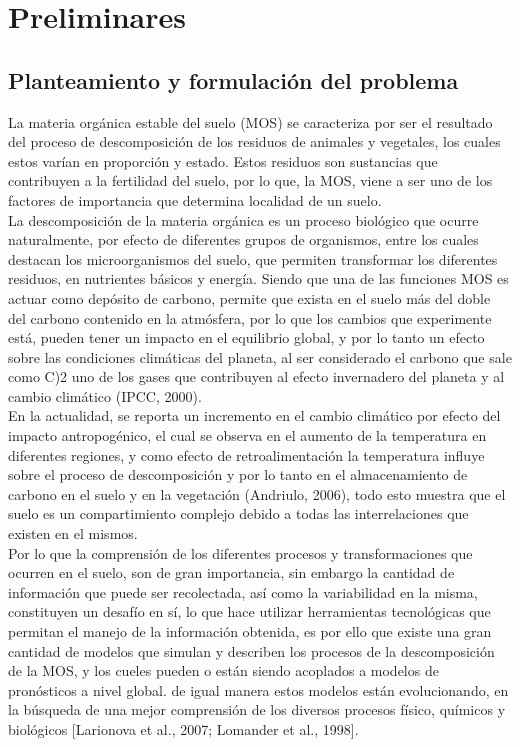 \chapter{Preliminares}

\section{Planteamiento y formulaci\'on del problema}
La materia orgánica estable del suelo (MOS) se caracteriza por ser el resultado del proceso de descomposición de los residuos de animales y vegetales, los cuales estos varían en proporción y estado. Estos residuos son sustancias que contribuyen a la fertilidad del suelo, por lo que, la MOS, viene a ser uno de los factores de importancia que determina localidad de un suelo.\\

La descomposición de la materia orgánica es un proceso biológico que ocurre naturalmente, por efecto de diferentes grupos de organismos, entre los cuales destacan los microorganismos del suelo, que permiten transformar los diferentes residuos, en nutrientes básicos y energía. Siendo que una de las funciones MOS es actuar como depósito de carbono, permite que exista en el suelo más del doble del carbono contenido en la atmósfera, por lo que los cambios que experimente está, pueden tener un impacto en el equilibrio global, y por lo tanto un efecto sobre las condiciones climáticas del planeta, al ser considerado el carbono que sale como C)2 uno de los gases que contribuyen al efecto invernadero del planeta y al cambio climático (IPCC, 2000).\\

En la actualidad, se reporta un incremento en el cambio climático por efecto del impacto antropogénico, el cual se observa en el aumento de la temperatura en diferentes regiones, y como efecto de retroalimentación la temperatura influye sobre el proceso de descomposición y por lo tanto en el almacenamiento de carbono en el suelo y en la vegetación (Andriulo, 2006), todo esto muestra que el suelo es un compartimiento complejo debido a todas las interrelaciones que existen en el mismos.\\

Por lo que la comprensión de los diferentes procesos y transformaciones que ocurren en el suelo, son de gran importancia, sin embargo la cantidad de información que puede ser recolectada, así como la variabilidad en la misma, constituyen un desafío en sí, lo que hace utilizar herramientas tecnológicas que permitan el manejo de la información obtenida, es por ello que existe una gran cantidad de modelos que simulan y describen los procesos de la descomposición de la MOS, y los cueles pueden o están siendo acoplados a modelos de pronósticos a nivel global. de igual manera estos modelos están evolucionando, en la búsqueda de una mejor comprensión de los diversos procesos físico, químicos y biológicos [Larionova et al., 2007; Lomander et al., 1998].\\


